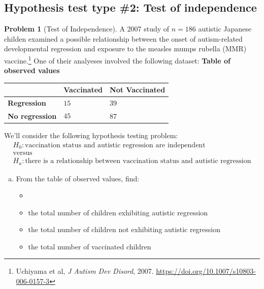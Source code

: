 \documentclass[10pt]{amsart}
\theoremstyle{definition}
\newtheorem{problem}[theorem]{Problem}
\newcommand{\vt}{\vskip 5mm} %
\newcommand{\Fl}{\vt\noindent\textbf} %
\newcommand{\1}[1]{\textbf{1}_{\left[#1\right]}} %
\begin{document}
\newpage
\subsection{Hypothesis test type \#2: Test of independence}
\begin{problem}[Test of Independence]
  A 2007 study of $n=186$ autistic Japanese childen examined a possible
  relationship between the onset of autism-related developmental regression
  and exposure to the measles mumps rubella (MMR) vaccine.\footnote{Uchiyama
    et al, \textit{J Autism Dev Disord}, 2007.
    \url{https://doi.org/10.1007/s10803-006-0157-3}} One of their analyeses
  involved the following dataset: \Fl{Table of observed values}
  \begin{center}
    \begin{tabular}{l|l|l|}
      & \textbf{Vaccinated} & \textbf{Not Vaccinated} \\ \hline
      \textbf{Regression}    & $15\phantom{\displaystyle\int}$ & $39$ \\ \hline
      \textbf{No regression} & $45\phantom{\displaystyle\int}$ & $87$ \\ \hline
    \end{tabular}
  \end{center}
  \vspace{1em}
  We'll consider the following hypothesis testing problem:
  \begin{gather*}
    H_{0}: \text{vaccination status and autistic regression are independent}\\
    \text{versus}\\
    H_{a}: \text{there is a relationship between vaccination status and autistic regression}
  \end{gather*}
  \begin{enumerate}[(a)]
    \setlength{\itemsep}{1em}
    \item From the table of observed values, find:
    \begin{itemize}
      \item[]
      \item the total number of children exhibiting autistic regression
      \vspace{.75cm}
      \item the total number of children not exhibiting autistic regression
      \vspace{.75cm}
      \item the total number of vaccinated children
      \vspace{.75cm}

\end{itemize}
\end{enumerate}
\end{problem}
\end{document}

